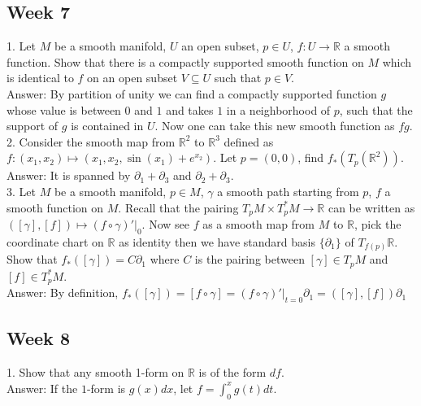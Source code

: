 \documentclass{article}
\theoremstyle{definition}
\begin{document}
\subsection{Week 7}

1. Let $M$ be a smooth manifold, $U$ an open subset, $p\in U$, $f: U\rightarrow \mathbb{R}$ a smooth function. Show that there is a compactly supported smooth function on $M$ which is identical to $f$ on an open subset $V\subseteq U$ such that $p\in V$.\\

Answer: By partition of unity we can find a compactly supported function $g$ whose value is between $0$ and $1$ and takes $1$ in a neighborhood of $p$, such that the support of $g$ is contained in $U$. Now one can take this new smooth function as $fg$.\\

2. Consider the smooth map from $\mathbb{R}^2$ to $\mathbb{R}^3$ defined as $f: (x_1, x_2)\mapsto (x_1, x_2, \sin(x_1)+e^{x_2})$. Let $p=(0, 0)$, find $f_*(T_p(\mathbb{R}^2))$.\\

Answer: It is spanned by $\partial_1+\partial_3$ and $\partial_2+\partial_3$.\\

3. Let $M$ be a smooth manifold, $p\in M$, $\gamma$ a smooth path starting from $p$, $f$ a smooth function on $M$. Recall that the pairing $T_pM\times T^*_pM\rightarrow \mathbb{R}$ can be written as $([\gamma], [f])\mapsto (f\circ \gamma)'|_0$. Now see $f$ as a smooth map from $M$ to $\mathbb{R}$, pick the coordinate chart on $\mathbb{R}$ as identity then we have standard basis $\{\partial_1\}$ of $T_{f(p)}\mathbb{R}$. Show that
$f_*([\gamma])=C\partial_1$ where $C$ is the pairing between $[\gamma]\in T_pM$ and $[f]\in T^*_pM$.\\

Answer: By definition, $f_*([\gamma])=[f\circ\gamma]=(f\circ\gamma)'|_{t=0}\partial_1=([\gamma], [f])\partial_1$

\subsection{Week 8}

1. Show that any smooth 1-form on $\mathbb{R}$ is of the form $df$.\\

Answer: If the $1$-form is $g(x)dx$, let $f=\int_0^x g(t)dt$.\\
\end{document}
